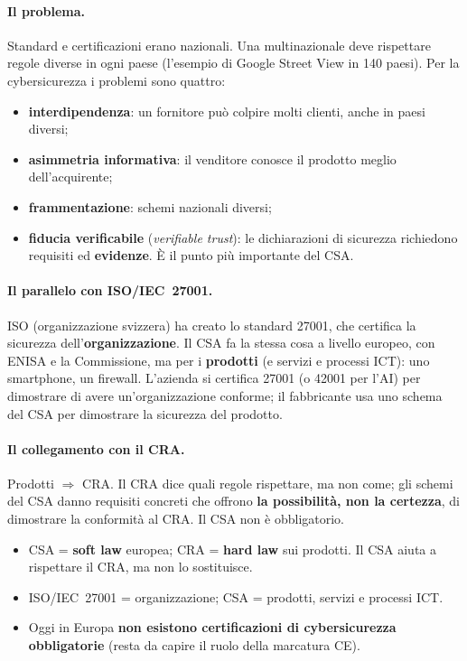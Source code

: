 \paragraph{Il problema.} Standard e certificazioni erano nazionali. Una multinazionale deve rispettare
regole diverse in ogni paese (l'esempio di Google Street View in 140 paesi). Per la cybersicurezza i
problemi sono quattro:
\begin{itemize}
  \item \textbf{interdipendenza}: un fornitore può colpire molti clienti, anche in paesi diversi;
  \item \textbf{asimmetria informativa}: il venditore conosce il prodotto meglio dell'acquirente;
  \item \textbf{frammentazione}: schemi nazionali diversi;
  \item \textbf{fiducia verificabile} (\emph{verifiable trust}): le dichiarazioni di sicurezza richiedono
    requisiti ed \textbf{evidenze}. È il punto più importante del CSA.
\end{itemize}

\paragraph{Il parallelo con ISO/IEC~27001.} ISO (organizzazione svizzera) ha creato lo standard 27001,
che certifica la sicurezza dell'\textbf{organizzazione}. Il CSA fa la stessa cosa a livello europeo,
con ENISA e la Commissione, ma per i \textbf{prodotti} (e servizi e processi ICT): uno smartphone, un
firewall. L'azienda si certifica 27001 (o 42001 per l'AI) per dimostrare di avere un'organizzazione
conforme; il fabbricante usa uno schema del CSA per dimostrare la sicurezza del prodotto.

\paragraph{Il collegamento con il CRA.} Prodotti $\Rightarrow$ CRA. Il CRA dice quali regole rispettare,
ma non come; gli schemi del CSA danno requisiti concreti che offrono \textbf{la possibilità, non la
certezza}, di dimostrare la conformità al CRA. Il CSA non è obbligatorio.
\begin{esame}
\begin{itemize}
  \item CSA = \textbf{soft law} europea; CRA = \textbf{hard law} sui prodotti. Il CSA aiuta a rispettare il
    CRA, ma non lo sostituisce.
  \item ISO/IEC~27001 = organizzazione; CSA = prodotti, servizi e processi ICT.
  \item Oggi in Europa \textbf{non esistono certificazioni di cybersicurezza obbligatorie} (resta da capire
    il ruolo della marcatura CE).
\end{itemize}
\end{esame}

